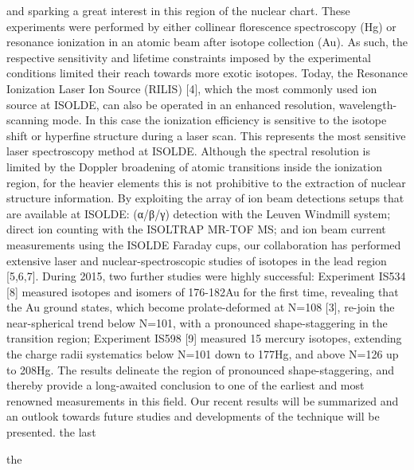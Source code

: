 and sparking a great interest in this region of the nuclear chart.  These experiments were performed by either collinear florescence spectroscopy (Hg) or resonance ionization in an atomic beam after isotope collection (Au).  As such, the respective sensitivity and lifetime constraints imposed by the experimental conditions limited their reach towards more exotic isotopes.  Today, the Resonance Ionization Laser Ion Source (RILIS) [4], which the most commonly used ion source at ISOLDE, can also be operated in an enhanced resolution, wavelength-scanning mode. In this case the ionization efficiency is sensitive to the isotope shift or hyperfine structure during a laser scan.  This represents the most sensitive laser spectroscopy method at ISOLDE. Although the spectral resolution is limited by the Doppler broadening of atomic transitions inside the ionization region, for the heavier elements this is not prohibitive to the extraction of nuclear structure information.  By exploiting the array of ion beam detections setups that are available at ISOLDE: (α/β/γ) detection with the Leuven Windmill system; direct ion counting with the ISOLTRAP MR-TOF MS; and ion beam current measurements using the ISOLDE Faraday cups, our collaboration has performed extensive laser and nuclear-spectroscopic studies of isotopes in the lead region [5,6,7].  During 2015, two further studies were highly successful: Experiment IS534 [8] measured isotopes and isomers of 176-182Au for the first time, revealing that the Au ground states, which become prolate-deformed at N=108 [3], re-join the near-spherical trend below N=101, with a pronounced shape-staggering in the transition region; Experiment IS598 [9] measured 15 mercury isotopes, extending the charge radii systematics below N=101 down to 177Hg, and above N=126 up to 208Hg.  The results delineate the region of pronounced shape-staggering, and thereby provide a long-awaited conclusion to one of the earliest and most renowned measurements in this field.   Our recent results will be summarized and an outlook towards future studies and developments of the technique will be presented.   the last 


the